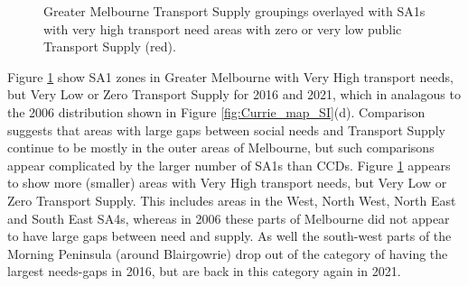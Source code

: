 \documentclass[preprint, 3p,
authoryear]{elsarticle} %
\begin{document}
\begin{figure}

{\centering {}

}

\caption{Greater Melbourne Transport Supply groupings overlayed with SA1s with very high transport need areas with zero or very low public Transport Supply (red).}\label{fig:Greater_Melbourne_2016_needs_gap_map_figure}
\end{figure}

Figure \ref{fig:Greater_Melbourne_2016_needs_gap_map_figure} show SA1
zones in Greater Melbourne with Very High transport needs, but Very Low
or Zero Transport Supply for 2016 and 2021, which in analagous to the
2006 distribution shown in Figure \ref{fig:Currie_map_SI}(d). Comparison
suggests that areas with large gaps between social needs and Transport
Supply continue to be mostly in the outer areas of Melbourne, but such
comparisons appear complicated by the larger number of SA1s than CCDs.
Figure \ref{fig:Greater_Melbourne_2016_needs_gap_map_figure} appears to
show more (smaller) areas with Very High transport needs, but Very Low
or Zero Transport Supply. This includes areas in the West, North West,
North East and South East SA4s, whereas in 2006 these parts of Melbourne
did not appear to have large gaps between need and supply. As well the
south-west parts of the Morning Peninsula (around Blairgowrie) drop out
of the category of having the largest needs-gaps in 2016, but are back
in this category again in 2021.
\end{document}
